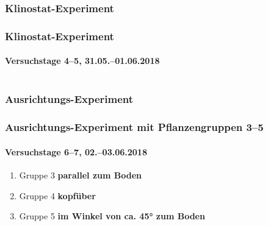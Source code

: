 \documentclass[aspectratio=169
]{beamer}
\begin{document}
\subsubsection{Klinostat-Experiment}

\begin{frame}%
\frametitle{Klinostat-Experiment}
\framesubtitle{Versuchstage 4--5, 31.05.--01.06.2018}
\begin{columns}
	
\end{columns}
\end{frame}

% 		
% 	
% 
% 
% 	


\subsubsection{Ausrichtungs-Experiment}
	
\begin{frame}[<+(1)->]
\frametitle{Ausrichtungs-Experiment mit Pflanzengruppen 3--5}
\framesubtitle{Versuchstage 6--7, 02.--03.06.2018}
	
\begin{enumerate}
\item Gruppe 3 \textbf{parallel zum Boden}
\item Gruppe 4 \textbf{kopfüber}
\item Gruppe 5 \textbf{im Winkel von ca. \ang{45} zum Boden}
\end{enumerate}
	
\end{frame}
\end{document}
